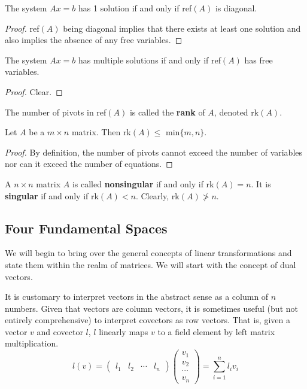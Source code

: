   \begin{theorem}
    The system $A x = b$ has 1 solution if and only if ref$(A)$ is diagonal. 
  \end{theorem}

  \begin{proof}
    ref$(A)$ being diagonal implies that there exists at least one solution and also implies the absence of any free variables. 
  \end{proof}

  \begin{theorem}
    The system $A x = b$ has multiple solutions if and only if ref$(A)$ has free variables. 
  \end{theorem}
  \begin{proof}
    Clear. 
  \end{proof}

  \begin{definition}[Rank]
    The number of pivots in ref$(A)$ is called the \textbf{rank} of $A$, denoted rk$(A)$. 
  \end{definition}

  \begin{theorem}
    Let $A$ be a $m \times n$ matrix. Then rk$(A) \leq$ min$\{m ,n\}$. 
  \end{theorem}
  \begin{proof}
    By definition, the number of pivots cannot exceed the number of variables nor can it exceed the number of equations. 
  \end{proof}

  \begin{definition}
    A $n \times n$ matrix $A$ is called \textbf{nonsingular} if and only if rk$(A) = n$. It is \textbf{singular} if and only if rk$(A) < n$. Clearly, rk$(A) \not> n$. 
  \end{definition}

\subsection{Four Fundamental Spaces}

  We will begin to bring over the general concepts of linear transformations and state them within the realm of matrices. We will start with the concept of dual vectors. 

  It is customary to interpret vectors in the abstract sense as a column of $n$ numbers. Given that vectors are column vectors, it is sometimes useful (but not entirely comprehensive) to interpret covectors as row vectors. That is, given a vector $v$ and covector $l$, $l$ linearly maps $v$ to a field element by left matrix multiplication. 
  \begin{equation}
    l(v) = \begin{pmatrix} l_1 & l_2 & \cdots & l_n \end{pmatrix} \begin{pmatrix}
    v_1 \\ v_2 \\ \cdots \\ v_n
    \end{pmatrix} = \sum_{i = 1}^{n} l_i v_i
  \end{equation}

